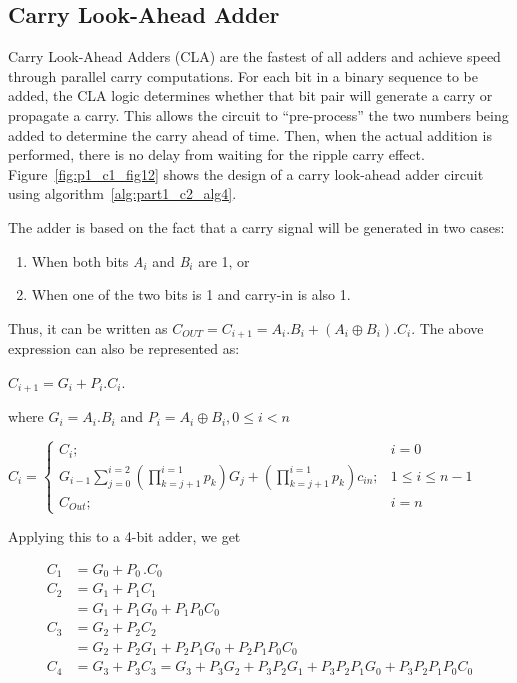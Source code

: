 \subsection{Carry Look-Ahead Adder}
Carry Look-Ahead Adders (CLA) are the fastest of all adders and achieve speed through parallel carry computations. For each bit in a binary sequence to be added, the CLA logic determines whether that bit pair will generate a carry or propagate a carry. This allows the circuit to ``pre-process'' the two numbers being added to determine the carry ahead of time. Then, when the actual addition is performed, there is no delay from waiting for the ripple carry effect. Figure~\ref{fig:p1_c1_fig12} shows the design of a carry look-ahead adder circuit using algorithm~\ref{alg:part1_c2_alg4}.

The adder is based on the fact that a carry signal will be generated in two cases: 
\begin{enumerate}
	\item When both bits {\it A${}_{i}$} and {\it B${}_{i}$} are 1, or
	\item  When one of the two bits is 1 and carry-in is also 1. 
\end{enumerate}

\noindent Thus, it can be written as
$C{}_{OUT} = C{}_{i + 1} = A{}_{i} . B{}_{i} + (A{}_{i}{\oplus } B{}_{i}) . C{}_{i}$.
\newline The above expression can also be represented as: 

$C{}_{i+1} = G{}_{i} + P{}_{i} . C{}_{i}$.

\noindent where  $G{}_{i} = A{}_{i} . B{}_{i}$ and $P{}_{i} = A_{i} \oplus B_{i} ,0 \le i < n$

$
C_i=\left\{\begin{matrix}
C_i;& i=0\\ 
G_{i-1}\sum_{j=0}^{i=2}\left ( \prod_{k=j+1}^{i=1}p_k \right )G_j+\left ( \prod_{k=j+1}^{i=1}p_k \right )c_{in};&1\le i\le n-1 \\ 
C_{Out};& i=n 
\end{matrix}\right.
$

\noindent Applying this to a {4}-bit adder, we get 



\begin{align*}
  C{}_{1} &= G{}_{0} + P{}_{0\ }. C{}_{0}\\
%
C{}_{2} &= G{}_{1} + P{}_{1} C{}_{1}\\
%
&= G{}_{1} + P{}_{1} G{}_{0} + P{}_{1} P{}_{0} C{}_{0}\\
%
C{}_{3} &= G{}_{2} + P{}_{2} C{}_{2}\\
%
&= G{}_{2} + P{}_{2} G{}_{1} + P{}_{2} P{}_{1} G{}_{0} + P{}_{2} P{}_{1} P{}_{0} C{}_{0}\\
%
C{}_{4} &= G{}_{3} + P{}_{3} C{}_{3} = G{}_{3} + P{}_{3} G{}_{2} + P{}_{3} P{}_{2} G{}_{1} + P{}_{3} P{}_{2} P{}_{1} G{}_{0}  + P{}_{3} P{}_{2} P{}_{1} P{}_{0} C{}_{0}
\end{align*}

